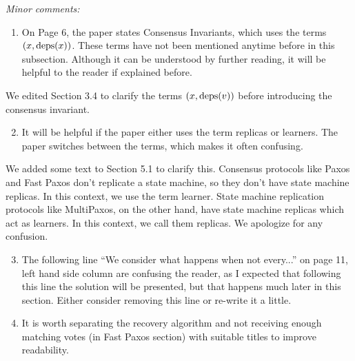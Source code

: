 \documentclass[letterpaper,twocolumn,10pt]{article}
\newenvironment{reviewerquote}
{\list{}{\leftmargin=\parindent\rightmargin=0in}\item[] \itshape \color{ReviewerDarkGray}}%
{\endlist}
\begin{document}
\begin{reviewerquote}
  Minor comments:

  \begin{enumerate}
    \setcounter{enumi}{0}
    \item
      On Page 6, the paper states Consensus Invariants, which uses the terms
      $(x, \text{deps}(x))$. These terms have not been mentioned anytime before in
      this subsection. Although it can be understood by further reading, it
      will be helpful to the reader if explained before.
  \end{enumerate}
\end{reviewerquote}

We edited Section 3.4 to clarify the terms $(x, \text{deps}(v))$ before introducing
the consensus invariant.

\begin{reviewerquote}
  \begin{enumerate}
    \setcounter{enumi}{1}
    \item
      It will be helpful if the paper either uses the term replicas or learners.
      The paper switches between the terms, which makes it often confusing.
  \end{enumerate}
\end{reviewerquote}

We added some text to Section 5.1 to clarify this. Consensus protocols like
Paxos and Fast Paxos don't replicate a state machine, so they don't have state
machine replicas. In this context, we use the term learner. State machine
replication protocols like MultiPaxos, on the other hand, have state machine
replicas which act as learners. In this context, we call them replicas. We
apologize for any confusion.

\begin{reviewerquote}
  \begin{enumerate}
    \setcounter{enumi}{2}
    \item
      The following line ``We consider what happens when not every...'' on page
      11, left hand side column are confusing the reader, as I expected that
      following this line the solution will be presented, but that happens much
      later in this section. Either consider removing this line or re-write it a
      little.
    \item
      It is worth separating the recovery algorithm and not receiving enough
      matching votes (in Fast Paxos section) with suitable titles to improve
      readability.
  \end{enumerate}
\end{reviewerquote}
\end{document}
